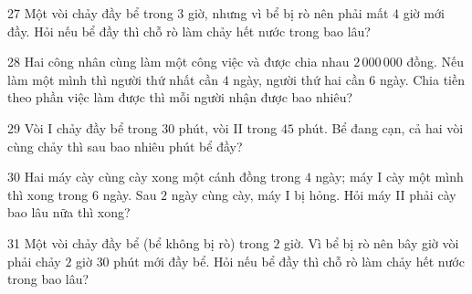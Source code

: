\gap
\begin{probbox}{27}{\relax}
Một vòi chảy đầy bể trong $3$ giờ, nhưng vì bể bị rò nên phải mất $4$ giờ mới đầy. Hỏi nếu bể đầy thì chỗ rò làm chảy hết nước trong bao lâu?
\end{probbox}
\gap
\begin{probbox}{28}{\relax}
Hai công nhân cùng làm một công việc và được chia nhau $2\,000\,000$ đồng. Nếu làm một mình thì người thứ nhất cần $4$ ngày, người thứ hai cần $6$ ngày. Chia tiền theo phần việc làm được thì mỗi người nhận được bao nhiêu?
\end{probbox}
\gap
\begin{probbox}{29}{\relax}
Vòi I chảy đầy bể trong $30$ phút, vòi II trong $45$ phút. Bể đang cạn, cả hai vòi cùng chảy thì sau bao nhiêu phút bể đầy?
\end{probbox}
\gap
\begin{probbox}{30}{\relax}
Hai máy cày cùng cày xong một cánh đồng trong $4$ ngày; máy I cày một mình thì xong trong $6$ ngày. Sau $2$ ngày cùng cày, máy I bị hỏng. Hỏi máy II phải cày bao lâu nữa thì xong?
\end{probbox}
\begin{probbox}{31}{}
Một vòi chảy đầy bể (bể không bị rò) trong $2$ giờ. Vì bể bị rò nên bây giờ vòi phải chảy $2$ giờ $30$ phút mới đầy bể. Hỏi nếu bể đầy thì chỗ rò làm chảy hết nước trong bao lâu?
\end{probbox}
